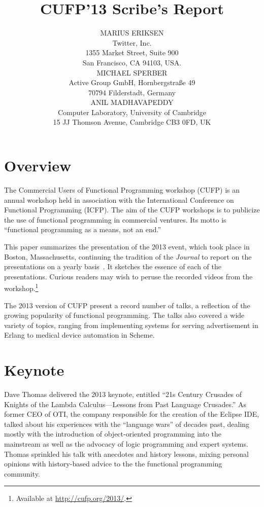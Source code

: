 \documentclass{jfp1}
\title{CUFP'13 Scribe's Report}
\author[Marius Eriksen, Michael Sperber and Anil Madhavapeddy]
       {MARIUS ERIKSEN\\
        Twitter, Inc.\\
        1355 Market Street, Suite 900 \\
        San Francisco, CA 94103, USA.\\
        MICHAEL SPERBER\\
         Active Group GmbH, Hornbergstra\ss{}e 49\\
         70794 Filderstadt, Germany\\
         ANIL MADHAVAPEDDY\\
        Computer Laboratory, University of Cambridge\\ 
        15 JJ Thomson Avenue, Cambridge CB3 0FD, UK}
\begin{document}
\maketitle


\section{Overview}

The Commercial Users of Functional Programming workshop (CUFP) is an annual
 workshop held in association with the International Conference on
 Functional Programming (ICFP).  The aim of the CUFP workshops is to
 publicize the use of functional programming in commercial ventures. Its
 motto is ``functional programming as a means, not an end.''

This paper summarizes the presentation of the 2013 event, which took place
 in Boston, Massachusetts, continuing the tradition of the {\it Journal\/}
 to report on the presentations on a yearly
 basis~\cite{JFP:9147276,JFP:8514633}. It sketches the essence of each of the
 presentations. Curious readers may wish to peruse the recorded videos from
 the workshop.\footnote{Available at \url{http://cufp.org/2013/}.}

The 2013 version of CUFP present a record number of talks, a reflection of
 the growing popularity of functional programming. The talks also covered a
 wide variety of topics, ranging from implementing systems for serving
 advertisement in Erlang to medical device automation in Scheme.

\section{Keynote}

Dave Thomas delivered the 2013 keynote, entitled ``21s Century Crusades of
Knights of the Lambda Calculus---Lessons from Past Language Crusades.''  As
former CEO of OTI, the company responsible for the creation of the Eclipse
IDE, talked about his experiences with the ``language wars'' of decades
past, dealing mostly with the introduction of object-oriented programming
into the mainstream as well as the advocacy of logic programming and expert
systems. Thomas sprinkled his talk with anecdotes and history lessons,
mixing personal opinions with history-based advice to the the functional
programming community.

\end{document}
